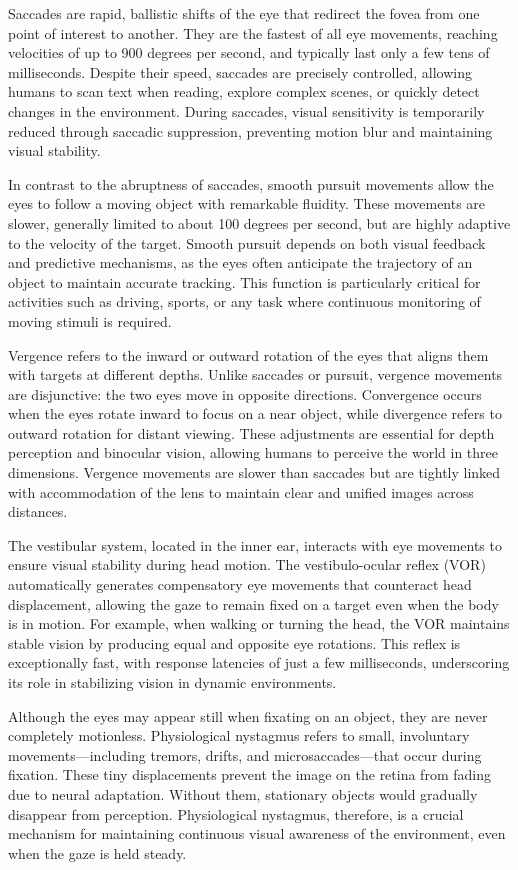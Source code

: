 \documentclass[12pt]{report}
\begin{document}
Saccades are rapid, ballistic shifts of the eye that redirect the fovea from one point of interest to another.
They are the fastest of all eye movements, reaching velocities of up to 900 degrees per second, and typically last only a few tens of milliseconds. 
Despite their speed, saccades are precisely controlled, allowing humans to scan text when reading, explore complex scenes, or quickly detect changes in the environment. 
During saccades, visual sensitivity is temporarily reduced through saccadic suppression, preventing motion blur and maintaining visual stability.

In contrast to the abruptness of saccades, smooth pursuit movements allow the eyes to follow a moving object with remarkable fluidity. 
These movements are slower, generally limited to about 100 degrees per second, but are highly adaptive to the velocity of the target.
Smooth pursuit depends on both visual feedback and predictive mechanisms, as the eyes often anticipate the trajectory of an object to maintain accurate tracking.
This function is particularly critical for activities such as driving, sports, or any task where continuous monitoring of moving stimuli is required.

Vergence refers to the inward or outward rotation of the eyes that aligns them with targets at different depths.
Unlike saccades or pursuit, vergence movements are disjunctive: the two eyes move in opposite directions.
Convergence occurs when the eyes rotate inward to focus on a near object, while divergence refers to outward rotation for distant viewing. 
These adjustments are essential for depth perception and binocular vision, allowing humans to perceive the world in three dimensions.
Vergence movements are slower than saccades but are tightly linked with accommodation of the lens to maintain clear and unified images across distances.

The vestibular system, located in the inner ear, interacts with eye movements to ensure visual stability during head motion. 
The vestibulo-ocular reflex (VOR) automatically generates compensatory eye movements that counteract head displacement, allowing the gaze to remain fixed on a target even when the body is in motion.
For example, when walking or turning the head, the VOR maintains stable vision by producing equal and opposite eye rotations. 
This reflex is exceptionally fast, with response latencies of just a few milliseconds, underscoring its role in stabilizing vision in dynamic environments.

Although the eyes may appear still when fixating on an object, they are never completely motionless.
Physiological nystagmus refers to small, involuntary movements—including tremors, drifts, and microsaccades—that occur during fixation. 
These tiny displacements prevent the image on the retina from fading due to neural adaptation. 
Without them, stationary objects would gradually disappear from perception. Physiological nystagmus, therefore, is a crucial mechanism for maintaining continuous visual awareness of the environment, even when the gaze is held steady.
\end{document}
